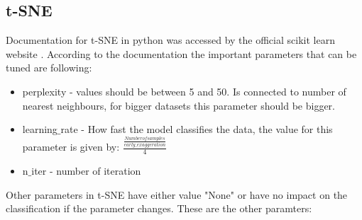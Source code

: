 \documentclass[12pt]{report}
\begin{document}
	\subsection*{t-SNE}
	Documentation for t-SNE in python was accessed by the official scikit learn website \cite{Doct-SNE}. According to the documentation the important parameters that can be tuned are following:
	\begin{itemize}
		\item perplexity - values should be between 5 and 50. Is connected to number of nearest neighbours, for bigger datasets this parameter should be bigger.
		\item learning$\_$rate - How fast the model classifies the data, the value for this parameter is given by: $\frac{\frac{Number of samples}{early\_exaggeration}}{4}$
		\item n$\_$iter - number of iteration
	\end{itemize}
	Other parameters in t-SNE have either value "None" or have no impact on the classification if the parameter changes. These are the other paramters:
\end{document}
